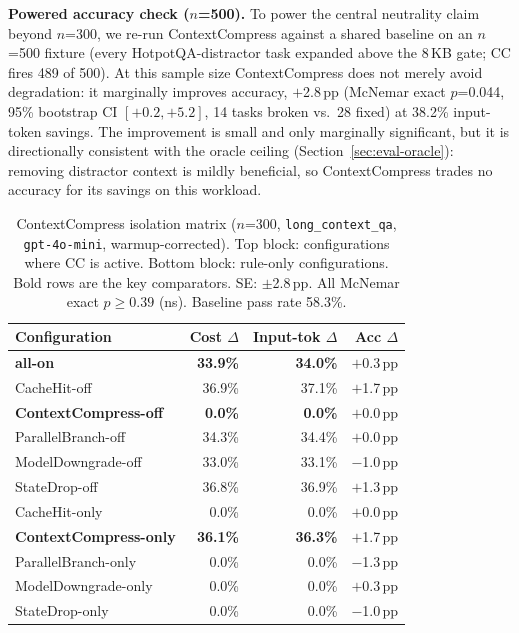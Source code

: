\textbf{Powered accuracy check ($n$=500).} To power the central neutrality claim beyond
$n$=300, we re-run ContextCompress against a shared baseline on an $n$=500 fixture (every
HotpotQA-distractor task expanded above the 8\,KB gate; CC fires 489 of 500). At this
sample size ContextCompress does not merely avoid degradation: it marginally improves
accuracy, $+$2.8\,pp (McNemar exact $p$=0.044, 95\% bootstrap CI $[+0.2,+5.2]$, 14 tasks
broken vs.\ 28 fixed) at 38.2\% input-token savings. The improvement is small and only
marginally significant, but it is directionally consistent with the oracle ceiling
(Section~\ref{sec:eval-oracle}): removing distractor context is mildly beneficial, so
ContextCompress trades no accuracy for its savings on this workload.

\begin{table}[t]
\caption{ContextCompress isolation matrix ($n$=300, \texttt{long\_context\_qa},
\texttt{gpt-4o-mini}, warmup-corrected). Top block: configurations where CC is
active. Bottom block: rule-only configurations. Bold rows are the key comparators.
SE: $\pm$2.8\,pp. All McNemar exact $p \geq 0.39$ (ns). Baseline pass rate 58.3\%.}
\label{tab:cc-matrix}
\small
\begin{tabular}{lrrr}
\toprule
Configuration & Cost $\Delta$ & Input-tok $\Delta$ & Acc $\Delta$ \\
\midrule
\textbf{all-on}                 & \textbf{33.9\%} & \textbf{34.0\%} & $+$0.3\,pp \\
CacheHit-off                    & 36.9\% & 37.1\% & $+$1.7\,pp \\
\textbf{ContextCompress-off}    & \textbf{0.0\%}  & \textbf{0.0\%}  & $+$0.0\,pp \\
ParallelBranch-off              & 34.3\% & 34.4\% & $+$0.0\,pp \\
ModelDowngrade-off              & 33.0\% & 33.1\% & $-$1.0\,pp \\
StateDrop-off                   & 36.8\% & 36.9\% & $+$1.3\,pp \\
\midrule
CacheHit-only                   & 0.0\%  & 0.0\%  & $+$0.0\,pp \\
\textbf{ContextCompress-only}   & \textbf{36.1\%} & \textbf{36.3\%} & $+$1.7\,pp \\
ParallelBranch-only             & 0.0\%  & 0.0\%  & $-$1.3\,pp \\
ModelDowngrade-only             & 0.0\%  & 0.0\%  & $+$0.3\,pp \\
StateDrop-only                  & 0.0\%  & 0.0\%  & $-$1.0\,pp \\
\bottomrule
\end{tabular}
\end{table}

